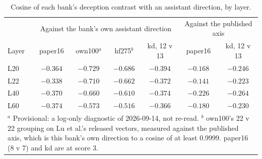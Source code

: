 \begin{table}[t]
\centering
\footnotesize
\caption{Cosine of each bank's deception contrast with an assistant direction, by layer.}
\label{tab:r-personas}
\begin{tabular}{lcccccc}
\hline
 & \multicolumn{4}{c}{Against the bank's own assistant direction} & \multicolumn{2}{c}{Against the published axis} \\
Layer & paper16 & own100$^{a}$ & hf275$^{b}$ & kd, 12 v 13 & paper16 & kd, 12 v 13 \\
\hline
L20 & $-0.364$ & $-0.729$ & $-0.686$ & $-0.394$ & $-0.168$ & $-0.246$ \\
L22 & $-0.338$ & $-0.710$ & $-0.662$ & $-0.372$ & $-0.141$ & $-0.223$ \\
L40 & $-0.370$ & $-0.660$ & $-0.610$ & $-0.374$ & $-0.226$ & $-0.264$ \\
L60 & $-0.374$ & $-0.573$ & $-0.516$ & $-0.366$ & $-0.180$ & $-0.230$ \\
\hline
\multicolumn{7}{p{140mm}}{$^{a}$ Provisional: a log-only diagnostic of 2026-09-14, not re-read. $^{b}$ own100's 22 v 22 grouping on Lu et al.'s released vectors, measured against the published axis, which is this bank's own direction to a cosine of at least 0.9999. paper16 (8 v 7) and kd are at score 3.} \\
\end{tabular}
\end{table}

